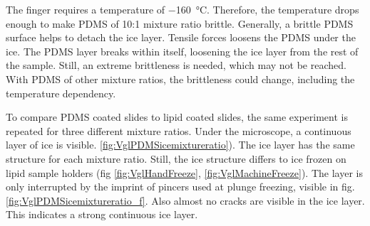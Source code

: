 
The finger requires a temperature of \SI{-160}{\degreeCelsius}. Therefore, the temperature drops enough to make PDMS of 10:1 mixture ratio brittle. Generally, a brittle PDMS surface helps to detach the ice layer. Tensile forces loosens the PDMS under the ice. The PDMS layer breaks within itself, loosening the ice layer from the rest of the sample. Still, an extreme brittleness is needed, which may not be reached. With PDMS of other mixture ratios, the brittleness could change, including the temperature dependency.

To compare PDMS coated slides to lipid coated slides, the same experiment is repeated for three different mixture ratios. Under the microscope, a continuous layer of ice is visible. \ref{fig:VglPDMSicemixtureratio}). The ice layer has the same structure for each mixture ratio. Still, the ice structure differs to ice frozen on lipid sample holders (fig \ref{fig:VglHandFreeze}, \ref{fig:VglMachineFreeze}). The layer is only interrupted by the imprint of pincers used at plunge freezing, visible in fig. \ref{fig:VglPDMSicemixtureratio_f}. Also almost no cracks are visible in the ice layer. This indicates a strong continuous ice layer.

